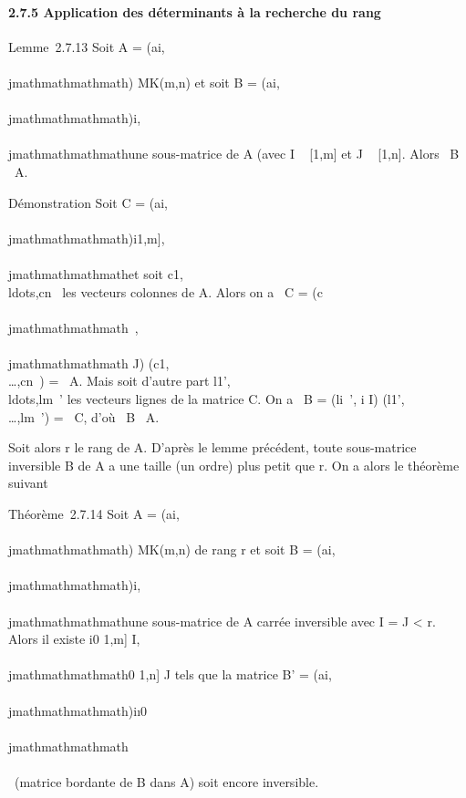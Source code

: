 \paragraph{2.7.5 Application des déterminants à la recherche du rang}

Lemme~2.7.13 Soit A = (ai,\\\\jmathmathmathmath) \in MK(m,n) et soit B =
(ai,\\\\jmathmathmathmath)i\inI,\\\\jmathmathmathmath\inJ une sous-matrice de A (avec I \subset~
{[}1,m{]} et J \subset~ {[}1,n{]}. Alors
\mathrmrg~B
\leq\mathrmrg~A.

Démonstration Soit C = (ai,\\\\jmathmathmathmath)i\in{[}1,m{]},\\\\jmathmathmathmath\inJ et soit
c1,\\ldots,cn~
les vecteurs colonnes de A. Alors on a
\mathrmrg~C
= \mathrmrg(c\\\\jmathmathmathmath~, \\\\jmathmathmathmath
\in J)
\leq\mathrmrg(c1,\\\ldots,cn~)
= \mathrmrg~A. Mais soit
d'autre part
l1',\\ldots,lm~'
les vecteurs lignes de la matrice C. On a
\mathrmrg~B
= \mathrmrg(li~',
i \in I)
\leq\mathrmrg(l1',\\\ldots,lm~')
= \mathrmrg~C, d'où
\mathrmrg~B
\leq\mathrmrg~A.

Soit alors r le rang de A. D'après le lemme précédent, toute
sous-matrice inversible B de A a une taille (un ordre) plus petit que r.
On a alors le théorème suivant

Théorème~2.7.14 Soit A = (ai,\\\\jmathmathmathmath) \in MK(m,n) de rang r
et soit B = (ai,\\\\jmathmathmathmath)i\inI,\\\\jmathmathmathmath\inJ une sous-matrice de A
carrée inversible avec \textbar{}I\textbar{} = \textbar{}J\textbar{}
\textless{} r. Alors il existe i0 \in {[}1,m{]} \diagdown I,\\\\jmathmathmathmath0
\in {[}1,n{]} \diagdown J tels que la matrice B' =
(ai,\\\\jmathmathmathmath)i\inI\cup\i0\,\\\\jmathmathmathmath\inJ\cup\\\\\
(matrice bordante de B dans A) soit encore inversible.

